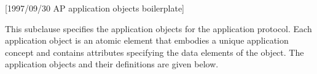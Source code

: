 [1997/09/30 AP application objects boilerplate]

  This subclause specifies the application objects for
the \theap\space application protocol. Each application
object is an atomic element that embodies a unique
application concept and contains attributes specifying
the data elements of the object. The application objects
and their definitions are given below.

\endinput
